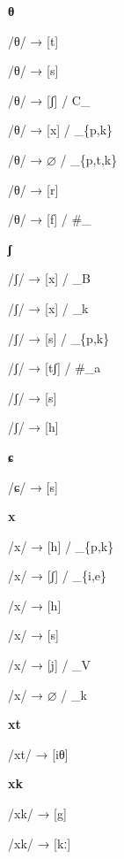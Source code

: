 \begin{center}\textbf{θ}\end{center}
\begin{multicols}{4}
\noindent /θ/ → [t]

\noindent /θ/ → [s]

\noindent /θ/ → [ʃ] / C\_

\noindent /θ/ → [x] / \_\{p,k\}

\noindent /θ/ → $\varnothing$ / \_\{p,t,k\}

\noindent /θ/ → [r]

\noindent /θ/ → [f] / \#\_
\end{multicols}


\begin{center}\textbf{ʃ}\end{center}
\begin{multicols}{4}
\noindent /ʃ/ → [x] / \_B

\noindent /ʃ/ → [x] / \_k

\noindent /ʃ/ → [s] / \_\{p,k\}

\noindent /ʃ/ → [tʃ] / \#\_a

\noindent /ʃ/ → [s]

\noindent /ʃ/ → [h]
\end{multicols}


\begin{center}\textbf{ɕ}\end{center}
\begin{multicols}{4}
\noindent /ɕ/ → [s]
\end{multicols}

\begin{center}\textbf{x}\end{center}
\begin{multicols}{4}
\noindent /x/ → [h] / \_\{p,k\}

\noindent /x/ → [ʃ] / \_\{i,e\}

\noindent /x/ → [h]

\noindent /x/ → [s]

\noindent /x/ → [j] / \_V

\noindent /x/ → $\varnothing$ / \_k
\end{multicols}


\begin{center}\textbf{xt}\end{center}
\begin{multicols}{4}
\noindent /xt/ → [iθ]
\end{multicols}


\begin{center}\textbf{xk}\end{center}
\begin{multicols}{4}
\noindent /xk/ → [g]

\noindent /xk/ → [kː]
\end{multicols}


